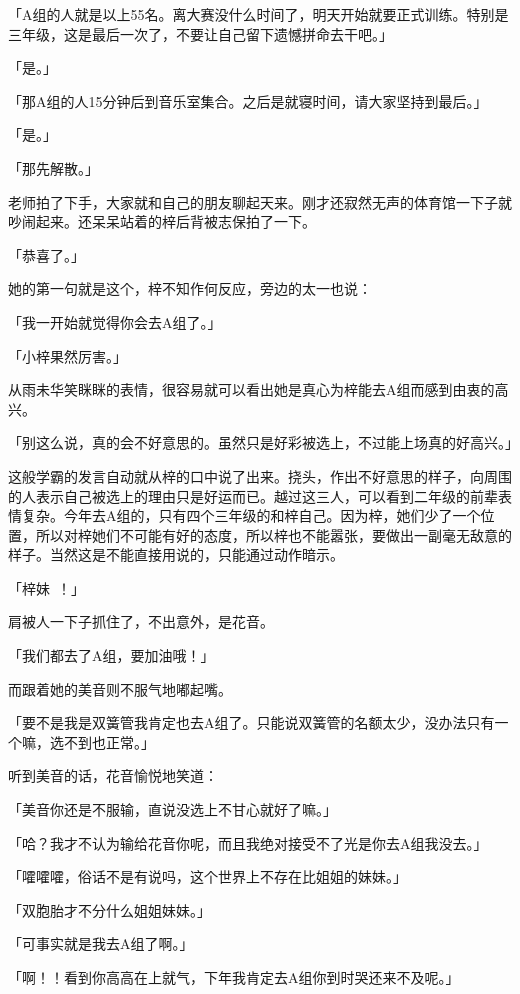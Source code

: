 \documentclass[UTF8]{ctexart}
\begin{document}
    「A组的人就是以上55名。离大赛没什么时间了，明天开始就要正式训练。特别是三年级，这是最后一次了，不要让自己留下遗憾拼命去干吧。」

    「是。」

    「那A组的人15分钟后到音乐室集合。之后是就寝时间，请大家坚持到最后。」

    「是。」

    「那先解散。」

    老师拍了下手，大家就和自己的朋友聊起天来。刚才还寂然无声的体育馆一下子就吵闹起来。还呆呆站着的梓后背被志保拍了一下。

    「恭喜了。」

    她的第一句就是这个，梓不知作何反应，旁边的太一也说：

    「我一开始就觉得你会去A组了。」

    「小梓果然厉害。」

    从雨未华笑眯眯的表情，很容易就可以看出她是真心为梓能去A组而感到由衷的高兴。

    「别这么说，真的会不好意思的。虽然只是好彩被选上，不过能上场真的好高兴。」

    这般学霸的发言自动就从梓的口中说了出来。挠头，作出不好意思的样子，向周围的人表示自己被选上的理由只是好运而已。越过这三人，可以看到二年级的前辈表情复杂。今年去A组的，只有四个三年级的和梓自己。因为梓，她们少了一个位置，所以对梓她们不可能有好的态度，所以梓也不能嚣张，要做出一副毫无敌意的样子。当然这是不能直接用说的，只能通过动作暗示。

    「梓妹~！」

    肩被人一下子抓住了，不出意外，是花音。

    「我们都去了A组，要加油哦！」

    而跟着她的美音则不服气地嘟起嘴。

    「要不是我是双簧管我肯定也去A组了。只能说双簧管的名额太少，没办法只有一个嘛，选不到也正常。」

    听到美音的话，花音愉悦地笑道：

    「美音你还是不服输，直说没选上不甘心就好了嘛。」

    「哈？我才不认为输给花音你呢，而且我绝对接受不了光是你去A组我没去。」

    「嚯嚯嚯，俗话不是有说吗，这个世界上不存在比姐姐的妹妹。」

    「双胞胎才不分什么姐姐妹妹。」

    「可事实就是我去A组了啊。」

    「啊！！看到你高高在上就气，下年我肯定去A组你到时哭还来不及呢。」
\end{document}
